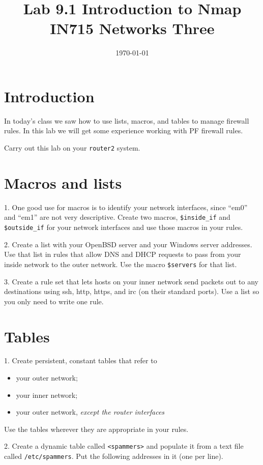 \documentclass{article}
\begin{document}
\title{ Lab 9.1 Introduction to Nmap\\ IN715 Networks Three}
\date{\today}
\maketitle

\section*{Introduction}
In today's class we saw how to use lists, macros, and tables to manage
firewall rules.  In this lab we will get some experience working with 
PF firewall rules.

Carry out this lab on your \texttt{router2} system.

\section{Macros and lists}
1.  One good use for macros is to identify your network interfaces, since ``em0'' and ``em1'' are not very descriptive.  Create two macros, \texttt{\$inside\_if} and \texttt{\$outside\_if} for your network interfaces and use those macros in your rules.

2.  Create a list with your OpenBSD server and your Windows server addresses.  Use that list in rules that allow DNS and DHCP requests to pass from your inside network to the outer network. Use the macro \texttt{\$servers} for that list.

3. Create a rule set that lets hosts on your inner network send packets out 
to any destinations using ssh, http, https, and irc (on their standard ports). Use a list so you only need to write one rule.

\section{Tables}

1. Create persistent, constant tables that refer to
\begin{itemize}
  \item your outer network;
  \item your inner network;
  \item your outer network, \emph{except the router interfaces}
\end{itemize}

Use the tables wherever they are appropriate in your rules.

2. Create a dynamic table called \texttt{<spammers>} and populate it from a text file called \texttt{/etc/spammers}. Put the following addresses in it (one per line).
\end{document}
